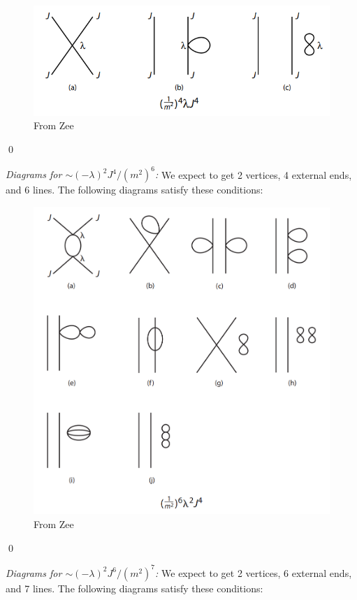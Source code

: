 \documentclass{book}
\theoremstyle{definition}
\begin{document}
\begin{figure}[!htb]
	\centering
	\includegraphics[scale=0.7]{feynman-diagram-1}
	\caption{From Zee}
\end{figure}\qed


\textit{Diagrams for $\sim (-\lambda)^2 J^4 / (m^2)^6$:} We expect to get 2 vertices, 4 external ends, and 6 lines. The following diagrams satisfy these conditions:\\

\begin{figure}[!htb]
	\centering
	\includegraphics[scale=0.3]{feynman-diagram-2}
	\caption{From Zee}
\end{figure} \qed


\textit{Diagrams for $\sim (-\lambda)^2 J^6 / (m^2)^7$:} We expect to get 2 vertices, 6 external ends, and 7 lines. The following diagrams satisfy these conditions:\\
\end{document}
